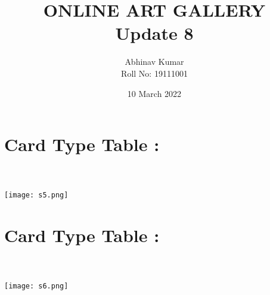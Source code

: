 \documentclass{article}
\title{ONLINE ART GALLERY \\ Update 8}
\date{10 March 2022}
\author{Abhinav Kumar \\ Roll No: 19111001 }
\begin{document}
\maketitle
\section*{Card Type Table : }
\\
\\
\texttt{[image: s5.png]}
\section*{Card Type Table : }
\\
\\
\texttt{[image: s6.png]}
\end{document}
